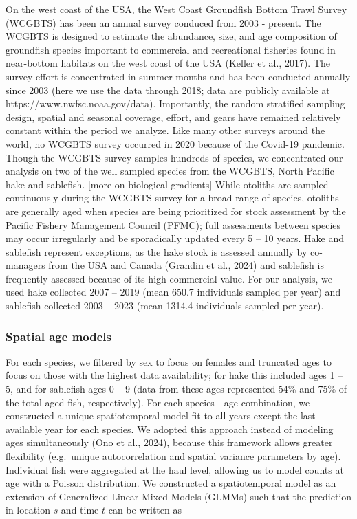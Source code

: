 \documentclass[
]{article}
\begin{document}
On the west coast of the USA, the West Coast Groundfish Bottom Trawl
Survey (WCGBTS) has been an annual survey conduced from 2003 - present.
The WCGBTS is designed to estimate the abundance, size, and age
composition of groundfish species important to commercial and
recreational fisheries found in near-bottom habitats on the west coast
of the USA (Keller et al., 2017). The survey effort is concentrated in
summer months and has been conducted annually since 2003 (here we use
the data through 2018; data are publicly available at
https://www.nwfsc.noaa.gov/data). Importantly, the random stratified
sampling design, spatial and seasonal coverage, effort, and gears have
remained relatively constant within the period we analyze. Like many
other surveys around the world, no WCGBTS survey occurred in 2020
because of the Covid-19 pandemic. Though the WCGBTS survey samples
hundreds of species, we concentrated our analysis on two of the well
sampled species from the WCGBTS, North Pacific hake and sablefish.
{[}more on biological gradients{]} While otoliths are sampled
continuously during the WCGBTS survey for a broad range of species,
otoliths are generally aged when species are being prioritized for stock
assessment by the Pacific Fishery Management Council (PFMC); full
assessments between species may occur irregularly and be sporadically
updated every 5 -- 10 years. Hake and sablefish represent exceptions, as
the hake stock is assessed annually by co-managers from the USA and
Canada (Grandin et al., 2024) and sablefish is frequently assessed
because of its high commercial value. For our analysis, we used hake
collected 2007 -- 2019 (mean 650.7 individuals sampled per year) and
sablefish collected 2003 -- 2023 (mean 1314.4 individuals sampled per
year).

\hypertarget{spatial-age-models}{%
\subsubsection{Spatial age models}\label{spatial-age-models}}

For each species, we filtered by sex to focus on females and truncated
ages to focus on those with the highest data availability; for hake this
included ages 1 -- 5, and for sablefish ages 0 -- 9 (data from these
ages represented 54\% and 75\% of the total aged fish, respectively).
For each species - age combination, we constructed a unique
spatiotemporal model fit to all years except the last available year for
each species. We adopted this approach instead of modeling ages
simultaneously (Ono et al., 2024), because this framework allows greater
flexibility (e.g.~unique autocorrelation and spatial variance parameters
by age). Individual fish were aggregated at the haul level, allowing us
to model counts at age with a Poisson distribution. We constructed a
spatiotemporal model as an extension of Generalized Linear Mixed Models
(GLMMs) such that the prediction in location \(s\) and time \(t\) can be
written as
\end{document}
